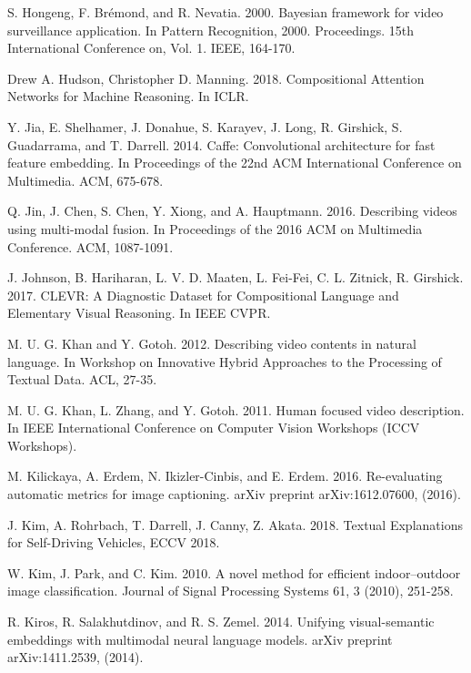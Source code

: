 \documentclass[10pt,journal,compsoc]{IEEEtran}
\begin{document}
\begin{thebibliography}{1}
S. Hongeng, F. Brémond, and R. Nevatia. 2000. Bayesian framework for video surveillance application. In Pattern Recognition, 2000. Proceedings. 15th International Conference on, Vol. 1. IEEE, 164-170.

Drew A. Hudson, Christopher D. Manning. 2018. Compositional Attention Networks for Machine Reasoning. In ICLR.

Y. Jia, E. Shelhamer, J. Donahue, S. Karayev, J. Long, R. Girshick, S. Guadarrama, and T. Darrell. 2014. Caffe: Convolutional architecture for fast feature embedding. In Proceedings of the 22nd ACM International Conference on Multimedia. ACM, 675-678.

Q. Jin, J. Chen, S. Chen, Y. Xiong, and A. Hauptmann. 2016. Describing videos using multi-modal fusion. In Proceedings of the 2016 ACM on Multimedia Conference. ACM, 1087-1091.

J. Johnson, B. Hariharan, L. V. D. Maaten, L. Fei-Fei, C. L. Zitnick, R. Girshick. 2017. CLEVR: A Diagnostic Dataset for
Compositional Language and Elementary Visual Reasoning. In IEEE CVPR.


M. U. G. Khan and Y. Gotoh. 2012. Describing video contents in natural language. In Workshop on Innovative Hybrid Approaches to the Processing of Textual Data. ACL, 27-35.

M. U. G. Khan, L. Zhang, and Y. Gotoh. 2011. Human focused video description. In IEEE International Conference on Computer Vision Workshops (ICCV Workshops).

M. Kilickaya, A. Erdem, N. Ikizler-Cinbis, and E. Erdem. 2016. Re-evaluating automatic metrics for image captioning. arXiv preprint arXiv:1612.07600, (2016).

J. Kim, A. Rohrbach, T. Darrell, J. Canny, Z. Akata. 2018. Textual Explanations for Self-Driving Vehicles, ECCV 2018.


W. Kim, J. Park, and C. Kim. 2010. A novel method for efficient indoor–outdoor image classification. Journal of Signal Processing Systems 61, 3 (2010), 251-258.

R. Kiros, R. Salakhutdinov, and R. S. Zemel. 2014. Unifying visual-semantic embeddings with multimodal neural language models. arXiv preprint arXiv:1411.2539, (2014).


\end{thebibliography}
\end{document}
